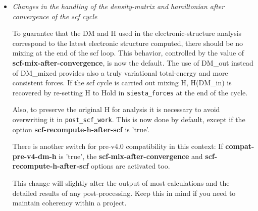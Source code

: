 \documentclass{article}
\newcommand{\opt}[1]{\textbf{#1}}
\newcommand{\code}[1]{\texttt{#1}}
\begin{document}
\begin{description}
\begin{itemize}
  \item\emph{Changes in the handling of the density-matrix and
    hamiltonian after convergence of the scf cycle}

    To guarantee that the DM and H used in the electronic-structure
    analysis correspond to the latest electronic structure computed,
    there should be no mixing at the end of the scf loop. This
    behavior, controlled by the value of \opt{scf-mix-after-convergence}, is
    now the default. The use of DM\_out instead of DM\_mixed provides
    also a truly variational total-energy and more consistent
    forces. If the scf cycle is carried out mixing H, H(DM\_in) is
    recovered by re-setting H to Hold in \code{siesta\_forces} at the end of
    the cycle.

    Also, to preserve the original H for analysis it is necessary to
    avoid overwriting it in \code{post\_scf\_work}. This is now done by
    default, except if the option \opt{scf-recompute-h-after-scf} is
    'true'.

    There is another switch for pre-v4.0 compatibility in this
    context: If \opt{compat-pre-v4-dm-h} is 'true', the
    \opt{scf-mix-after-convergence} and \opt{scf-recompute-h-after-scf}
    options are activated too.

    This change will slightly alter the output of most calculations
    and the detailed results of any post-processing. Keep this in mind
    if you need to maintain coherency within a project.
    
  \end{itemize}

\end{description}
\end{document}
